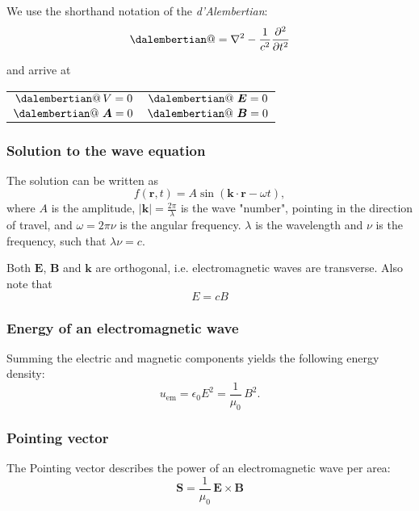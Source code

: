 \documentclass[a4paper, 12pt]{article}
\makeatletter
\renewcommand{\vec}[1]{\bm{#1}}
\newcommand{\E}{\ensuremath{\vec{E}}}
\newcommand{\e}{\ensuremath{\epsilon_0}}
\newcommand{\B}{\ensuremath{\vec{B}}}
\newcommand{\dalambert}{\mathop{\mathpalette\dalembertian@\relax}}
\newcommand{\dalembertian@}[2]{%
  \begingroup
  \sbox\z@{$\m@th#1\square$}%
  \dimen0=\fontdimen8
    \ifx#1\displaystyle\textfont\else
    \ifx#1\textstyle\textfont\else
    \ifx#1\scriptstyle\scriptfont\else
    \scriptscriptfont\fi\fi\fi3
  \makebox[\wd\z@]{%
    \hbox to \ht\z@{%
      \vrule width \dimen0
      \kern-\dimen0
      \vbox to \ht\z@{
        \hrule height \dimen0 width \ht\z@
        \vss
        \hrule height 2\dimen0
      }%
      \kern-2.5\dimen0
      \vrule width 2.5\dimen0
    }%
  }%
  \endgroup
}
\makeatother
\begin{document}
            We use the shorthand notation of the \textit{d'Alembertian}: 
            \begin{equation*}
                \dalambert = \nabla^2 - \frac{1}{c^2}\frac{\partial^2}{\partial t^2}
            \end{equation*}

            and arrive at
            \begin{center}
                \begin{tabular}{ c|c }
                    $\dalambert V = 0$&$ \dalambert\,\E = 0$\\
                    $\dalambert\,\vec{A} = 0 $&$\dalambert\,\B = 0$
                \end{tabular}
            \end{center}
        \subsubsection{Solution to the wave equation}
            The solution  can be written as
            \begin{equation*}
                f(\vec{r}, t) = A\sin\left(\vec{k}\cdot\vec{r} - \omega t\right),
            \end{equation*}
            where $A$ is the amplitude, $|\vec{k}| = \frac{2\pi}{\lambda}$ is the wave "number", pointing in the direction of travel, 
            and $\omega = 2\pi\nu$ is the angular frequency. $\lambda$ is the wavelength and $\nu$ is the frequency, such that
            $\lambda\nu = c$.

            Both \E, \B{} and $\vec{k}$ are orthogonal, i.e. electromagnetic waves are transverse. Also note that 
            \begin{equation}
                E = cB
            \end{equation}

        \subsubsection{Energy of an electromagnetic wave}
            Summing the electric and magnetic components yields the following energy density: 
            \begin{equation}
                u_{\text{em}} = \e E^2 = \frac{1}{\mu_0}\, B^2.
            \end{equation}
        
        \subsubsection{Pointing vector}
            The Pointing vector describes the power of an electromagnetic wave per area:
            \begin{equation}
                \vec{S} = \frac{1}{\mu_0}\,\E\times\B
            \end{equation}
\end{document}
